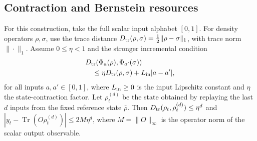 \subsection{Contraction and Bernstein resources}
\label{app:bernstein-resources}

For this construction, take the full scalar input alphabet $[0,1]$.
For density operators $\rho,\sigma$, use the trace distance
$D_{\rm tr}(\rho,\sigma)=\tfrac12\|\rho-\sigma\|_1$, with trace norm
$\|\cdot\|_1$. Assume $0\leq\eta<1$ and the stronger incremental condition
\begin{equation}
 \begin{aligned}
 &D_{\rm tr}(\Phi_a(\rho),\Phi_{a'}(\sigma))\\
 &\quad\leq\eta D_{\rm tr}(\rho,\sigma)+L_{\rm in}|a-a'|,
 \end{aligned}
 \label{eq:incremental-lipschitz}
\end{equation}
for all inputs $a,a'\in[0,1]$, where $L_{\rm in}\geq0$ is the input
Lipschitz constant and $\eta$ the state-contraction factor.
Let $\rho_t^{(d)}$ be the state obtained by replaying the last $d$ inputs
from the fixed reference state $\bar\rho$. Then
$D_{\rm tr}(\rho_t,\rho_t^{(d)})\leq\eta^d$ and
$|y_t-\operatorname{Tr}(O\rho_t^{(d)})|\leq2M\eta^d$,
where $M=\|O\|_\infty$ is the operator norm of the scalar output observable.

